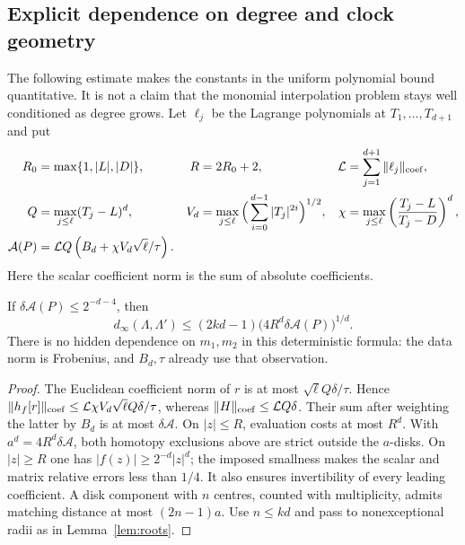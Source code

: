\subsection{Explicit dependence on degree and clock geometry}
The following estimate makes the constants in the uniform polynomial
bound quantitative. It is not a claim that the monomial interpolation
problem stays well conditioned as degree grows.
Let $\ell_j$ be the Lagrange polynomials at $T_1,\ldots,T_{d+1}$ and put
\begin{align*}
 R_0&=\max\{1,|L|,|D|\},& R&=2R_0+2,&
 \mathcal L&=\sum_{j=1}^{d+1}\|\ell_j\|_{\rm coef},\\
 Q&=\max_{j\le\ell}(T_j-L)^d,&
 V_d&=\max_{j\le\ell}\Big(\sum_{i=0}^{d-1}|T_j|^{2i}\Big)^{1/2},&
 \chi&=\max_{j\le\ell}\left(\frac{T_j-L}{T_j-D}\right)^d,\\
 \mathcal A(P)&=\mathcal L Q\left(B_d+\chi V_d\sqrt\ell/\tau\right).
\end{align*}
Here the scalar coefficient norm is the sum of absolute coefficients.
\begin{proposition}\label{prop:explicit}
If $\delta\mathcal A(P)\le2^{-d-4}$, then
\begin{equation}\label{eq:explicit}
 d_\infty(\Lambda,\Lambda')
 \le (2kd-1)\big(4R^d\delta\mathcal A(P)\big)^{1/d}.
\end{equation}
There is no hidden dependence on $m_1,m_2$ in this deterministic formula:
the data norm is Frobenius, and $B_d,\tau$ already use that observation.
\end{proposition}
\begin{proof}
The Euclidean coefficient norm of $r$ is at most
$\sqrt\ell Q\delta/\tau$. Hence
$\|h_f[r]\|_{\rm coef}\le\mathcal L\chi V_d\sqrt\ell Q\delta/\tau$,
whereas $\|H\|_{\rm coef}\le\mathcal L Q\delta$.
Their sum after weighting the latter by $B_d$ is at most
$\delta\mathcal A$. On $|z|\le R$, evaluation costs at most $R^d$.
With $a^d=4R^d\delta\mathcal A$, both homotopy exclusions above are
strict outside the $a$-disks. On $|z|\ge R$ one has
$|f(z)|\ge2^{-d}|z|^d$; the imposed smallness makes the scalar and
matrix relative errors less than $1/4$. It also ensures invertibility
of every leading coefficient. A disk component with $n$ centres,
counted with multiplicity, admits matching distance at most $(2n-1)a$.
Use $n\le kd$ and pass to nonexceptional radii as in Lemma~\ref{lem:roots}.
\end{proof}
